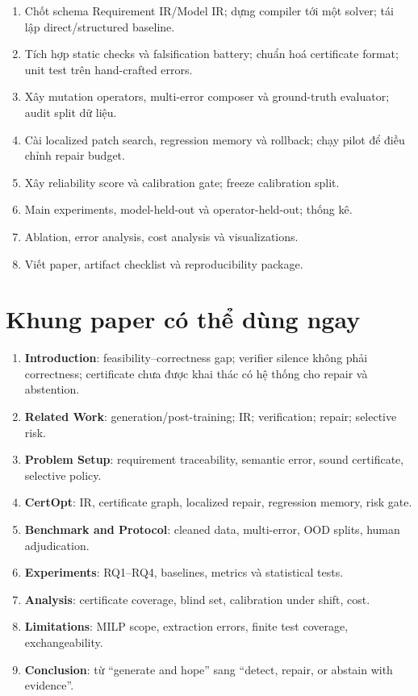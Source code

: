 \documentclass[11pt,a4paper]{article}
\newcommand{\method}{\textsf{\textbf{CertOpt}}\xspace}
\begin{document}
\begin{enumerate}
  \item[\textbf{Tuần 1--2}] Chốt schema Requirement IR/Model IR; dựng compiler tới một solver; tái lập direct/structured baseline.
  \item[\textbf{Tuần 3--4}] Tích hợp static checks và falsification battery; chuẩn hoá certificate format; unit test trên hand-crafted errors.
  \item[\textbf{Tuần 5--6}] Xây mutation operators, multi-error composer và ground-truth evaluator; audit split dữ liệu.
  \item[\textbf{Tuần 7--8}] Cài localized patch search, regression memory và rollback; chạy pilot để điều chỉnh repair budget.
  \item[\textbf{Tuần 9}] Xây reliability score và calibration gate; freeze calibration split.
  \item[\textbf{Tuần 10}] Main experiments, model-held-out và operator-held-out; thống kê.
  \item[\textbf{Tuần 11}] Ablation, error analysis, cost analysis và visualizations.
  \item[\textbf{Tuần 12}] Viết paper, artifact checklist và reproducibility package.
\end{enumerate}

\section{Khung paper có thể dùng ngay}

\begin{enumerate}
  \item \textbf{Introduction}: feasibility--correctness gap; verifier silence không phải correctness; certificate chưa được khai thác có hệ thống cho repair và abstention.
  \item \textbf{Related Work}: generation/post-training; IR; verification; repair; selective risk.
  \item \textbf{Problem Setup}: requirement traceability, semantic error, sound certificate, selective policy.
  \item \textbf{\method}: IR, certificate graph, localized repair, regression memory, risk gate.
  \item \textbf{Benchmark and Protocol}: cleaned data, multi-error, OOD splits, human adjudication.
  \item \textbf{Experiments}: RQ1--RQ4, baselines, metrics và statistical tests.
  \item \textbf{Analysis}: certificate coverage, blind set, calibration under shift, cost.
  \item \textbf{Limitations}: MILP scope, extraction errors, finite test coverage, exchangeability.
  \item \textbf{Conclusion}: từ ``generate and hope'' sang ``detect, repair, or abstain with evidence''.
\end{enumerate}
\end{document}
